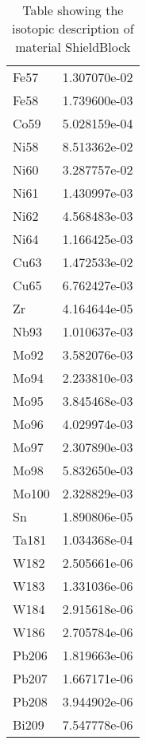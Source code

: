 \begin{centering}
\begin{table}[ht!]
\begin{tabular}{l | c}
Fe57 & 1.307070e-02\\
Fe58 & 1.739600e-03\\
Co59 & 5.028159e-04\\
Ni58 & 8.513362e-02\\
Ni60 & 3.287757e-02\\
Ni61 & 1.430997e-03\\
Ni62 & 4.568483e-03\\
Ni64 & 1.166425e-03\\
Cu63 & 1.472533e-02\\
Cu65 & 6.762427e-03\\
Zr & 4.164644e-05\\
Nb93 & 1.010637e-03\\
Mo92 & 3.582076e-03\\
Mo94 & 2.233810e-03\\
Mo95 & 3.845468e-03\\
Mo96 & 4.029974e-03\\
Mo97 & 2.307890e-03\\
Mo98 & 5.832650e-03\\
Mo100 & 2.328829e-03\\
Sn & 1.890806e-05\\
Ta181 & 1.034368e-04\\
W182 & 2.505661e-06\\
W183 & 1.331036e-06\\
W184 & 2.915618e-06\\
W186 & 2.705784e-06\\
Pb206 & 1.819663e-06\\
Pb207 & 1.667171e-06\\
Pb208 & 3.944902e-06\\
Bi209 & 7.547778e-06
\end{tabular}
\caption{Table showing the isotopic description of material ShieldBlock}
\label{table:material_ShieldBlock}
\end{table}\clearpage


\end{centering}
